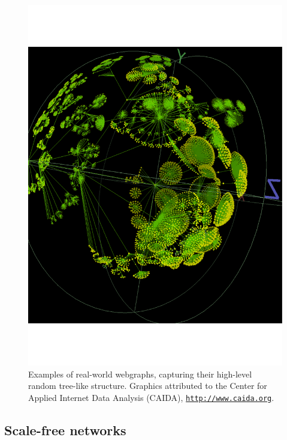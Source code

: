 \documentclass[aps, rmp, twocolumn, amsmath, amssymb, nofootinbib, superscriptaddress, longbibliography, floatfix, table-of-contents, eqsecnum]{revtex4-1}
\newcommand{\comment}[1]{{\color{blue}{\textbf{#1}}}}
\begin{document}
\begin{figure}[!htb]
\includegraphics[width=\columnwidth]{webgraph_2}
\caption{Examples of real-world webgraphs, capturing their high-level random tree-like structure. Graphics attributed to the Center for Applied Internet Data Analysis (CAIDA), \texttt{\href{http://www.caida.org}{http://www.caida.org}}.} \label{fig:webgraph}
\end{figure}

%
%

\subsection{Scale-free networks}

\comment{To do}
\end{document}
